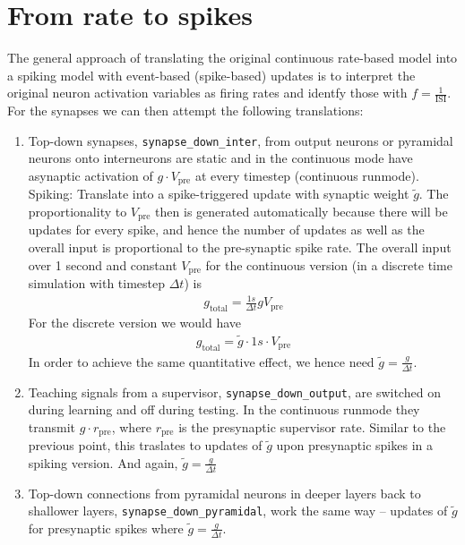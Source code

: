 \documentclass{article}
\begin{document}
\section{From rate to spikes}
The general approach of translating the original continuous rate-based
model into a spiking model with event-based (spike-based) updates is
to interpret the original neuron activation variables as firing rates
and identfy those with $f= \frac{1}{\text{ISI}}$. For the synapses we
can then attempt the following translations:
\begin{enumerate}
\item
  Top-down synapses, \verb+synapse_down_inter+, from output neurons or
  pyramidal neurons onto interneurons are static and in the continuous
  mode have asynaptic activation of $g \cdot V_{\text{pre}}$ at every
  timestep (continuous runmode). \\ Spiking: Translate into a
  spike-triggered update with synaptic weight $\tilde{g}$. The proportionality
  to $V_{\text{pre}}$ then is generated automatically because there
  will be updates for every spike, and hence the number of updates as
  well as the overall input is proportional to the pre-synaptic spike
  rate. The overall input over 1 second and constant $V_{\text{pre}}$
  for the continuous version (in a discrete time simulation with
  timestep $\Delta t$) is
  \begin{align}
    g_{\text{total}}= \frac{1 s}{\Delta t} g V_{\text{pre}} 
  \end{align}
  For the discrete version we would have
  \begin{align}
    g_{\text{total}} = \tilde{g} \cdot 1 s \cdot V_{\text{pre}}
  \end{align}
  In order to achieve the same quantitative effect, we hence need
  $\tilde{g} = \frac{g}{\Delta t}$.
\item
  Teaching signals from a supervisor, \verb+synapse_down_output+, are
  switched on during learning and off during testing. In the
  continuous runmode they transmit $g \cdot r_{\text{pre}}$, where
  $r_{\text{pre}}$ is the presynaptic supervisor rate. Similar to the
  previous point, this traslates to updates of $\tilde{g}$ upon
  presynaptic spikes in a spiking version. And again, $\tilde{g} =
  \frac{g}{\Delta t}$
\item
  Top-down connections from pyramidal neurons in deeper layers back to
  shallower layers, \verb+synapse_down_pyramidal+, work the same way -- updates of $\tilde{g}$ for
  presynaptic spikes where $\tilde{g}= \frac{g}{\Delta t}$.

\end{enumerate}
\end{document}

